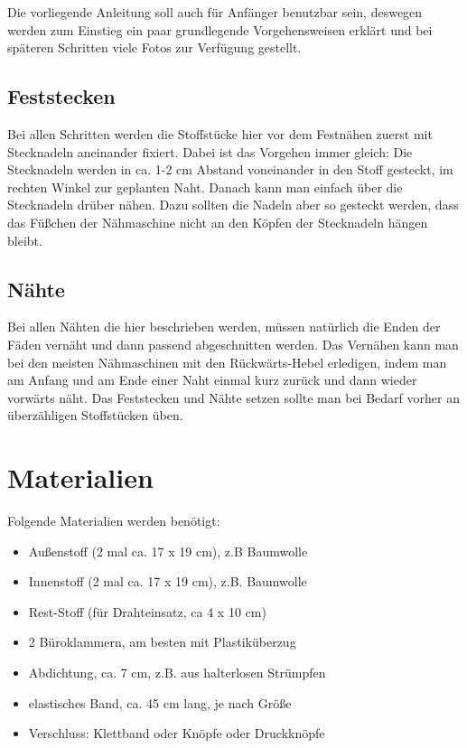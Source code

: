 \documentclass[12pt,parskip=full]{scrartcl}
\begin{document}
Die vorliegende Anleitung soll auch für Anfänger benutzbar sein, deswegen werden zum Einstieg ein paar grundlegende Vorgehensweisen erklärt und bei späteren Schritten viele Fotos zur Verfügung gestellt.

\subsection*{Feststecken}
Bei allen Schritten werden die Stoffstücke hier vor dem Festnähen zuerst mit Stecknadeln aneinander fixiert. Dabei ist das Vorgehen immer gleich: Die Stecknadeln werden in ca. 1-2 cm Abstand voneinander in den Stoff gesteckt, im rechten Winkel zur geplanten Naht. Danach kann man einfach über die Stecknadeln drüber nähen. Dazu sollten die Nadeln aber so gesteckt werden, dass das Füßchen der Nähmaschine nicht an den Köpfen der Stecknadeln hängen bleibt.

\subsection*{Nähte}
Bei allen Nähten die hier beschrieben werden, müssen natürlich die Enden der Fäden vernäht und dann passend abgeschnitten werden. Das Vernähen kann man bei den meisten Nähmaschinen mit den Rückwärts-Hebel erledigen, indem man am Anfang und am Ende einer Naht einmal kurz zurück und dann wieder vorwärts näht. Das Feststecken und Nähte setzen sollte man bei Bedarf vorher an überzähligen Stoffstücken üben.

\section*{Materialien}
Folgende Materialien werden benötigt:
\begin{itemize}
    \item Außenstoff (2 mal ca. 17 x 19 cm), z.B Baumwolle
    \item Innenstoff (2 mal ca. 17 x 19 cm), z.B. Baumwolle
    \item Rest-Stoff (für Drahteinsatz, ca 4 x 10 cm)
    \item 2 Büroklammern, am besten mit Plastiküberzug
    \item Abdichtung, ca. 7 cm, z.B. aus halterlosen Strümpfen
    \item elastisches Band, ca. 45 cm lang, je nach Größe
    \item Verschluss: Klettband oder Knöpfe oder Druckknöpfe
\end{itemize}
\end{document}
